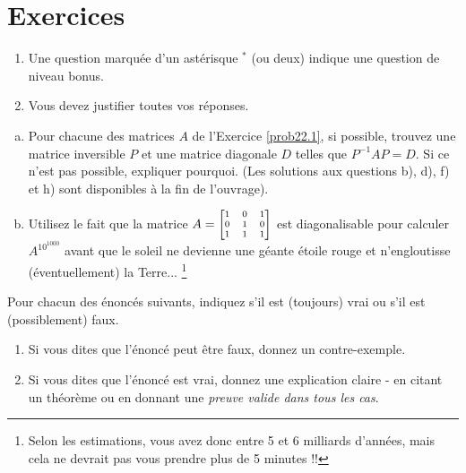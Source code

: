 \section*{Exercices}


\begin{enumerate}
\item Une question marquée d'un astérisque $ ^\ast$ (ou deux) indique une question de niveau bonus.
 \item Vous devez justifier toutes vos réponses.
\end{enumerate}
\bigskip


\begin{prob} \label{prob23.1} 
\begin{enumerate}[a)]
\item Pour chacune des matrices $A$ de l'Exercice \ref{prob22.1}, si possible, trouvez une matrice inversible $P$ et une matrice diagonale $D$ telles que $P^{-1}AP =D$. Si ce n'est pas possible, expliquer pourquoi. (Les solutions aux questions b), d), f) et h) sont disponibles à la fin de l'ouvrage). 

\item Utilisez le fait que la matrice $A=\scriptsize\bmatrix 
1&0&1\\0&1&0\\1&1&1 \endbmatrix $ est diagonalisable pour calculer $A^{10^{1000}}$ avant que le soleil ne devienne une géante \'etoile rouge et n'engloutisse (éventuellement) la Terre... \footnote{Selon les estimations, vous avez donc entre 5 et 6 milliards d'années, mais cela ne devrait pas vous prendre plus de 5 minutes !\!!} 

\end{enumerate}

 

\end{prob} \begin{prob} \label{prob23.2}  Pour chacun des énoncés suivants, indiquez s'il est (toujours) vrai ou s'il est (possiblement) faux.    
\begin{enumerate}[$\bullet$]
\item Si vous dites que l'\'enonc\'e peut être faux, donnez un contre-exemple.   
\item Si vous dites que l'\'enonc\'e est vrai, donnez une explication claire - en citant un théorème ou en donnant une {\it preuve valide dans tous les cas}. 
\end{enumerate}
\smallskip


\end{prob}
